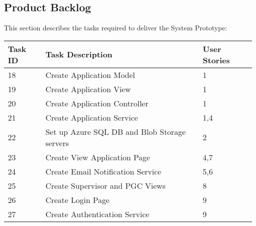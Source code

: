 \documentclass[11pt]{article}
\begin{document}
\subsection{Product Backlog}
This section describes the tasks required to deliver the System Prototype:
\begin{table}[H]
	\begin{tabular}{@{}|l|l|l|@{}}
		\toprule
		Task ID & Task Description & User Stories \\ \midrule
			18	&      Create Application Model & 1     \\ \midrule
			19	&      Create Application View & 1     \\ \midrule
			20	&      Create Application Controller & 1     \\ \midrule
			21	&      Create Application Service & 1,4    \\ \midrule
			22	&      Set up Azure SQL DB and Blob Storage servers& 2     \\ \midrule
			23	&      Create View Application Page & 4,7     \\ \midrule
			24	&      Create Email Notification Service     & 5,6     \\ \midrule
			25	&      Create Supervisor and PGC Views     &8  \\ \midrule
			26  & 		Create Login Page			& 9 \\ \midrule
			27  & Create Authentication Service		& 9  \\ \bottomrule
	\end{tabular}
\end{table}
\end{document}

